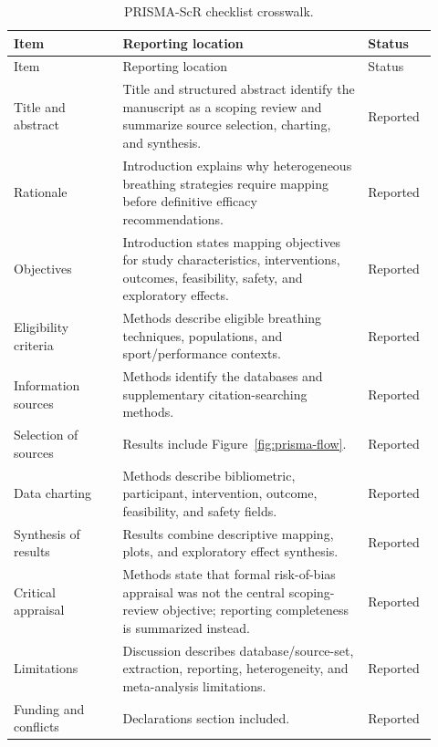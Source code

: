 \begin{longtable}{@{}p{0.24\linewidth}p{0.54\linewidth}p{0.14\linewidth}@{}}
\caption{PRISMA-ScR checklist crosswalk.}
\label{tab:prisma-checklist}\\
\toprule
Item & Reporting location & Status \\
\midrule
\endfirsthead
\toprule
Item & Reporting location & Status \\
\midrule
\endhead
Title and abstract & Title and structured abstract identify the manuscript as a scoping review and summarize source selection, charting, and synthesis. & Reported \\
Rationale & Introduction explains why heterogeneous breathing strategies require mapping before definitive efficacy recommendations. & Reported \\
Objectives & Introduction states mapping objectives for study characteristics, interventions, outcomes, feasibility, safety, and exploratory effects. & Reported \\
Eligibility criteria & Methods describe eligible breathing techniques, populations, and sport/performance contexts. & Reported \\
Information sources & Methods identify the databases and supplementary citation-searching methods. & Reported \\
Selection of sources & Results include Figure~\ref{fig:prisma-flow}. & Reported \\
Data charting & Methods describe bibliometric, participant, intervention, outcome, feasibility, and safety fields. & Reported \\
Synthesis of results & Results combine descriptive mapping, plots, and exploratory effect synthesis. & Reported \\
Critical appraisal & Methods state that formal risk-of-bias appraisal was not the central scoping-review objective; reporting completeness is summarized instead. & Reported \\
Limitations & Discussion describes database/source-set, extraction, reporting, heterogeneity, and meta-analysis limitations. & Reported \\
Funding and conflicts & Declarations section included. & Reported \\
\bottomrule
\end{longtable}
